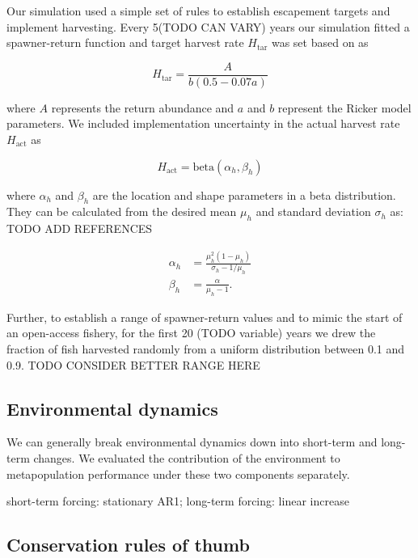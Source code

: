 Our simulation used a simple set of rules to establish escapement
targets and implement harvesting. Every 5(TODO CAN VARY) years our
simulation fitted a spawner-return function and target harvest rate
$H_{\mathrm{tar}}$ was set based on \citet{Hilborn1992} as

\begin{equation}
  H_{\mathrm{tar}} = \frac{A}{b (0.5 - 0.07a)}
  \label{eq:esc}
\end{equation}

\noindent
where $A$ represents the return abundance and $a$ and $b$ represent the
Ricker model parameters. We included implementation uncertainty in the
actual harvest rate $H_{\mathrm{act}}$ as

\begin{equation}
  H_{\mathrm{act}} = \mathrm{beta}(\alpha_h, \beta_h)
\end{equation}

\noindent
where $\alpha_h$ and $\beta_h$ are the location and shape parameters in
a beta distribution. They can be calculated from the desired mean
$\mu_h$ and standard deviation $\sigma_h$ as: TODO ADD REFERENCES

\begin{align}
  \alpha_h &= \frac{\mu_h^2(1 - \mu_h)}{\sigma_h - 1/\mu_h}\\
   \beta_h &= \frac{\alpha}{\mu_h - 1}.
\end{align}

\noindent
Further, to establish a range of spawner-return values and to mimic the
start of an open-access fishery, for the first 20 (TODO variable) years
we drew the fraction of fish harvested randomly from a uniform
distribution between 0.1 and 0.9. TODO CONSIDER BETTER RANGE HERE

\subsection{Environmental dynamics}

We can generally break environmental dynamics down into short-term and
long-term changes. We evaluated the contribution of the environment to
metapopulation performance under these two components separately.

short-term forcing: stationary AR1; long-term forcing: linear increase

\subsection{Conservation rules of thumb}

